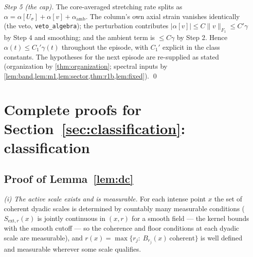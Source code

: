 \documentclass[11pt,letterpaper]{amsart}
\theoremstyle{definition}
\theoremstyle{remark}
\newcommand{\norm}[1]{\lVert #1 \rVert}
\newcommand{\abs}[1]{\lvert #1 \rvert}
\begin{document}
\emph{Step 5 (the cap).} The core-averaged stretching rate splits as
$\alpha=\alpha[U_\sigma]+\alpha[v]+\alpha_{\mathrm{amb}}$. The column's own axial
strain vanishes identically (the veto, \texttt{veto\_algebra}); the perturbation
contributes $\abs{\alpha[v]}\le C\norm{v}_{F_1}\le C'\gamma$ by Step 4 and smoothing;
and the ambient term is $\le C\gamma$ by Step 2. Hence $\alpha(t)\le C_1'\gamma(t)$
throughout the episode, with $C_1'$ explicit in the class constants. The hypotheses
for the next episode are re-supplied as stated (organization by
\cref{thm:organization}; spectral inputs by
\cref{lem:band,lem:m1,lem:sector,thm:r1b,lem:fixed}). \qed


\section{Complete proofs for Section~\ref{sec:classification}: classification}\label{pfsec:classification}

\subsection{Proof of Lemma~\ref{lem:dc}}\label{pf:dc}
\emph{(i) The active scale exists and is measurable.} For each intense point $x$ the
set of coherent dyadic scales is determined by countably many measurable conditions
($S_{\mathrm{ext},r}(x)$ is jointly continuous in $(x,r)$ for a smooth field
--- the kernel bounds with the smooth cutoff --- so the coherence and floor
conditions at each dyadic scale are measurable), and
$r(x)=\max\{r_j:\ B_{r_j}(x)\ \text{coherent}\}$ is well defined and measurable
wherever some scale qualifies.
\end{document}
